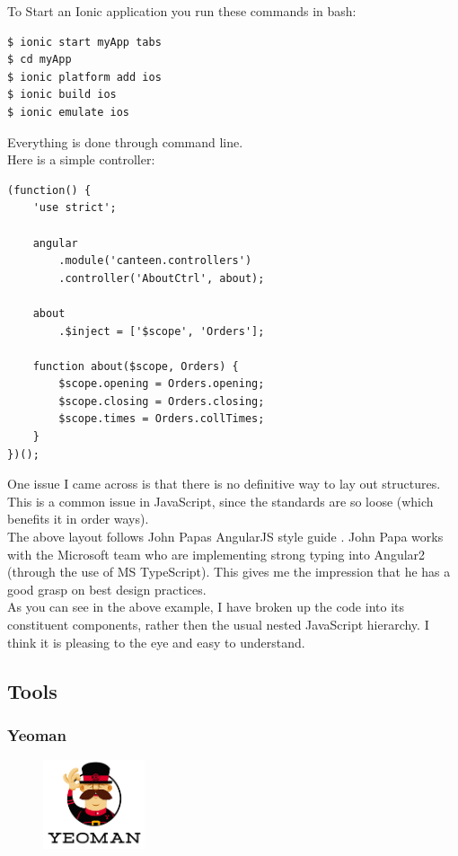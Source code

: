 To Start an Ionic application you run these commands in bash:
\begin{verbatim}
$ ionic start myApp tabs
$ cd myApp
$ ionic platform add ios
$ ionic build ios
$ ionic emulate ios
\end{verbatim}
Everything is done through command line.
\\

Here is a simple controller:
\begin{verbatim}
(function() {
    'use strict';

    angular
        .module('canteen.controllers')
        .controller('AboutCtrl', about);

    about
        .$inject = ['$scope', 'Orders'];

    function about($scope, Orders) {
        $scope.opening = Orders.opening;
        $scope.closing = Orders.closing;
        $scope.times = Orders.collTimes;
    }
})();
\end{verbatim}
One issue I came across is that there is no definitive way to lay out structures.
This is a common issue in JavaScript, since the standards are so loose (which benefits it in order ways).
\\

The above layout follows John Papas AngularJS style guide \cite{angular_style_guide}.
John Papa works with the Microsoft team who are implementing strong typing into Angular2 (through the use of MS TypeScript).
This gives me the impression that he has a good grasp on best design practices.
\\

As you can see in the above example, I have broken up the code into its constituent components, rather then the usual nested JavaScript hierarchy.
I think it is pleasing to the eye and easy to understand.

\subsection{Tools}
\subsubsection{Yeoman}
\begin{figure}
\includegraphics[width=3cm]{img/mobile-app/logos/yeoman.png}
\end{figure} 

